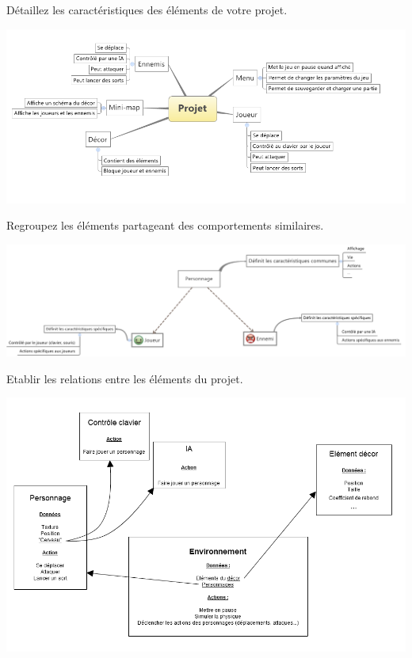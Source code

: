 \begin{frame}
    Détaillez les caractéristiques des éléments de votre projet.
    \begin{center}
        \includegraphics[scale=0.4]{images/project_overview2.png}
    \end{center}
\end{frame}

\begin{frame}
    Regroupez les éléments partageant des comportements similaires.
    \begin{center}
        \includegraphics[scale=0.3]{images/project_overview3.png}
    \end{center}
\end{frame}

\begin{frame}
    Etablir les relations entre les éléments du projet.
    \begin{center}
        \includegraphics[scale=0.4]{images/project_overview4.png}
    \end{center}
\end{frame}

